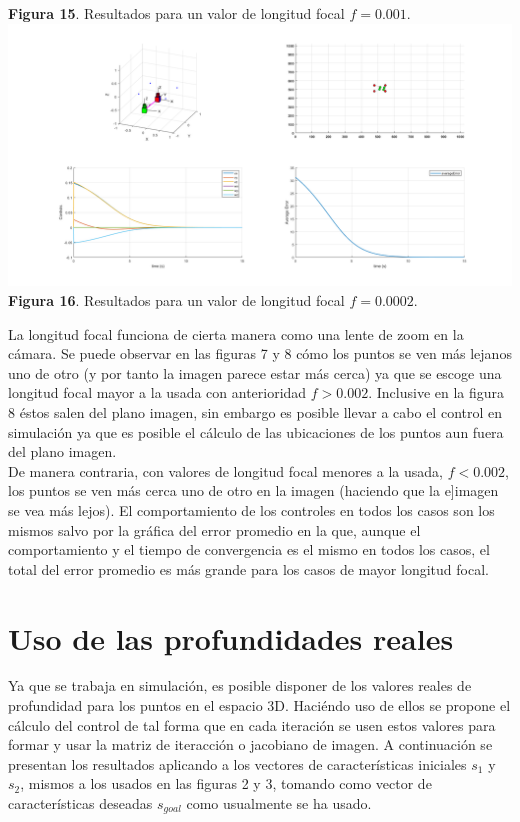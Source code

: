 \documentclass{article}
\begin{document}
\begin{center}
		{\footnotesize \textbf{Figura 15}. Resultados para un valor de longitud focal $f=0.001$.}\\
		\includegraphics[scale=0.3]{fig5_4.png}\\
		{\footnotesize \textbf{Figura 16}. Resultados para un valor de longitud focal $f=0.0002$.}\\
	\end{center}
	
	La longitud focal funciona de cierta manera como una lente de zoom en la c\'amara. Se puede observar en las figuras 7 y 8 c\'omo los puntos se ven m\'as lejanos uno de otro (y por tanto la imagen parece estar m\'as cerca) ya que se escoge una longitud focal mayor a la usada con anterioridad $f>0.002$. Inclusive en la figura 8 \'estos salen del plano imagen, sin embargo es posible llevar a cabo el control en simulaci\'on ya que es posible el c\'alculo de las ubicaciones de los puntos aun fuera del plano imagen.\\
	
	De manera contraria, con valores de longitud focal menores a la usada, $f<0.002$, los puntos se ven m\'as cerca uno de otro en la imagen (haciendo que la e]imagen se vea m\'as lejos). El comportamiento de los controles en todos los casos son los mismos salvo por la gr\'afica del error promedio en la que, aunque el comportamiento y el tiempo de convergencia es el mismo en todos los casos, el total del error promedio es m\'as grande para los casos de mayor longitud focal.
	
	\section{Uso de las profundidades reales}
	Ya que se trabaja en simulaci\'on, es posible disponer de los valores reales de profundidad para los puntos en el espacio 3D. Haci\'endo uso de ellos se propone el c\'alculo del control de tal forma que en cada iteraci\'on se usen estos valores para formar y usar la matriz de iteracci\'on o jacobiano de imagen. A continuaci\'on se presentan los resultados aplicando a los vectores de caracter\'isticas iniciales $s_1$ y $s_2$, mismos a los usados en las figuras 2 y 3, tomando como vector de caracter\'isticas deseadas $s_{goal}$ como usualmente se ha usado.
	
\end{document}
